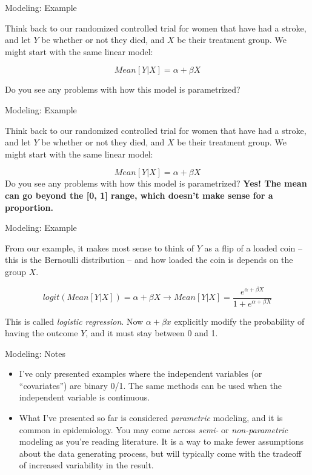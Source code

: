 \documentclass[ignorenonframetext,]{beamer}
\providecommand{\tightlist}{%
  \setlength{\itemsep}{0pt}\setlength{\parskip}{0pt}}
\begin{document}
\begin{frame}{Modeling: Example}
\protect\hypertarget{modeling-example}{}

Think back to our randomized controlled trial for women that have had a
stroke, and let \(Y\) be whether or not they died, and \(X\) be their
treatment group. We might start with the same linear model:

\[
Mean[Y|X] = \alpha + \beta X
\]

Do you see any problems with how this model is parametrized?

\end{frame}

\begin{frame}{Modeling: Example}
\protect\hypertarget{modeling-example-1}{}

Think back to our randomized controlled trial for women that have had a
stroke, and let \(Y\) be whether or not they died, and \(X\) be their
treatment group. We might start with the same linear model:

\[
Mean[Y|X] = \alpha + \beta X
\] Do you see any problems with how this model is parametrized?
\textbf{Yes! The mean can go beyond the {[}0, 1{]} range, which doesn't
make sense for a proportion.}

\end{frame}

\begin{frame}{Modeling: Example}
\protect\hypertarget{modeling-example-2}{}

From our example, it makes most sense to think of \(Y\) as a flip of a
loaded coin -- this is the Bernoulli distribution -- and how loaded the
coin is depends on the group \(X\).

\[
logit(Mean[Y|X]) = \alpha + \beta X \to Mean[Y|X] = \frac{e^{\alpha + \beta X}}{1 + e^{\alpha + \beta X}}
\]

This is called \emph{logistic regression}. Now \(\alpha + \beta x\)
explicitly modify the probability of having the outcome \(Y\), and it
must stay between 0 and 1.

\end{frame}

\begin{frame}{Modeling: Notes}
\protect\hypertarget{modeling-notes}{}

\begin{itemize}
\tightlist
\item
  I've only presented examples where the independent variables (or
  ``covariates'') are binary 0/1. The same methods can be used when the
  independent variable is continuous.
\item
  What I've presented so far is considered \emph{parametric} modeling,
  and it is common in epidemiology. You may come across \emph{semi-} or
  \emph{non-parametric} modeling as you're reading literature. It is a
  way to make fewer assumptions about the data generating process, but
  will typically come with the tradeoff of increased variability in the
  result.
\end{itemize}

\end{frame}
\end{document}
